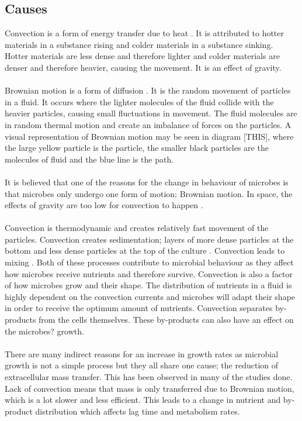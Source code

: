 \documentclass[12pt]{article}
\begin{document}
\subsection{Causes}
Convection is a form of energy transfer due to heat . It is attributed to hotter materials in a substance rising and colder materials in a substance sinking. Hotter materials are less dense and therefore lighter and colder materials are denser and therefore heavier, causing the movement. It is an effect of gravity. 
\\
\\Brownian motion is a form of diffusion . It is the random movement of particles in a fluid. It occurs where the lighter molecules of the fluid collide with the heavier particles, causing small fluctuations in movement. The fluid molecules are in random thermal motion and create an imbalance of forces on the particles. A visual representation of Brownian motion may be seen in diagram [THIS], where the large yellow particle is the particle, the smaller black particles are the molecules of fluid and the blue line is the path.
\\ \\It is believed that one of the reasons for the change in behaviour of microbes is that microbes only undergo one form of motion; Brownian motion. In space, the effects of gravity are too low for convection to happen . 
\\ \\Convection is thermodynamic and creates relatively fast movement of the particles. Convection creates sedimentation; layers of more dense particles at the bottom and less dense particles at the top of the culture . Convection leads to mixing . Both of these processes contribute to microbial behaviour as they affect how microbes receive nutrients and therefore survive. Convection is also a factor of how microbes grow and their shape.  The distribution of nutrients in a fluid is highly dependent on the convection currents and microbes will adapt their shape in order to receive the optimum amount of nutrients. Convection separates by-products from the cells themselves.  These by-products can also have an effect on the microbes? growth.
\\ \\There are many indirect reasons for an increase in growth rates as microbial growth is not a simple process but they all share one cause; the reduction of extracellular mass transfer.  This has been observed in many of the studies done. Lack of convection means that mass is only transferred due to Brownian motion, which is a lot slower and less efficient. This leads to a change in nutrient and by-product distribution which affects lag time and metabolism rates.
\end{document}

